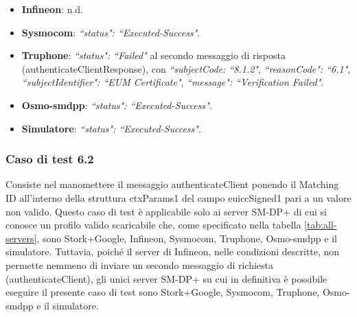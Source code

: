\documentclass[10pt, oneside]{book}
\begin{document}
\begin{itemize}
\item \textbf{Infineon}: n.d.
\item \textbf{Sysmocom}: \textit{``status": ``Executed-Success"}.
\item \textbf{Truphone}: \textit{``status": ``Failed"} al secondo messaggio di risposta (authenticateClientResponse), con \textit{``subjectCode: ``8.1.2"}, \textit{``reasonCode": ``6.1"}, \textit{``subjectIdentifier": ``EUM Certificate"}, \textit{``message": ``Verification Failed"}.
\item \textbf{Osmo-smdpp}: \textit{``status": ``Executed-Success"}.
\item \textbf{Simulatore}: \textit{``status": ``Executed-Success"}.
\end{itemize}

\subsubsection{Caso di test 6.2}
Consiste nel manomettere il messaggio authenticateClient ponendo il Matching ID all'interno della struttura ctxParams1 del campo euiccSigned1 pari a un valore non valido. Questo caso di test è applicabile solo ai server SM-DP+ di cui si conosce un profilo valido scaricabile che, come specificato nella tabella \ref{tab:all-servers}, sono Stork+Google, Infineon, Sysmocom, Truphone, Osmo-smdpp e il simulatore. Tuttavia, poiché il server di Infineon, nelle condizioni descritte, non permette nemmeno di inviare un secondo messaggio di richiesta (authenticateClient), gli unici server SM-DP+ su cui in definitiva è possibile eseguire il presente caso di test sono Stork+Google, Sysmocom, Truphone, Osmo-smdpp e il simulatore.
\end{document}
